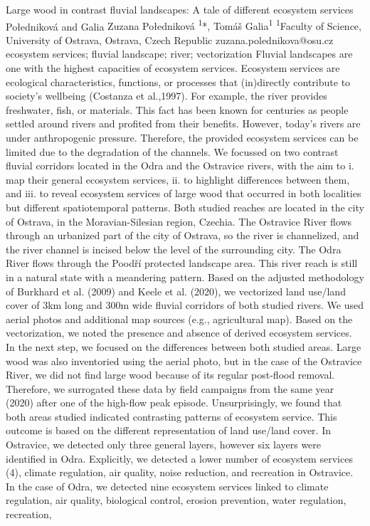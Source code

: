 \abstract
{Large wood in contrast fluvial landscapes: A tale of different ecosystem services} 
{Połedniková and Galia} 
{Zuzana Połedniková \textsuperscript{1}*, Tomáš Galia\textsuperscript{1}} 
{\TLtag} 
{
\textsuperscript{1}Faculty of Science, University of Ostrava, Ostrava, Czech Republic
}
{zuzana.polednikova@osu.cz}  %
{ecosystem services; fluvial landscape; river; vectorization}
{
Fluvial landscapes are one with the highest capacities of ecosystem services. Ecosystem services are ecological characteristics, functions, or processes that (in)directly contribute to society's wellbeing (Costanza et al.,1997). For example, the river provides freshwater, fish, or materials. This fact has been known for centuries as people settled around rivers and profited from their benefits. However, today’s rivers are under anthropogenic pressure. Therefore, the provided ecosystem services can be limited due to the degradation of the channels. We focussed on two contrast fluvial corridors located in the Odra and the Ostravice rivers, with the aim to i. map their general ecosystem services, ii. to highlight differences between them, and iii. to reveal ecosystem services of large wood that occurred in both localities but different spatiotemporal patterns. Both studied reaches are located in the city of Ostrava, in the Moravian-Silesian region, Czechia. The Ostravice River flows through an urbanized part of the city of Ostrava, so the river is channelized, and the river channel is incised below the level of the surrounding city. The Odra River flows through the Poodří protected landscape area. This river reach is still in a natural state with a meandering pattern. Based on the adjusted methodology of Burkhard et al. (2009) and Keele et al. (2020), we vectorized land use/land cover of 3km long and 300m wide fluvial corridors of both studied rivers.  We used aerial photos and additional map sources (e.g., agricultural map). Based on the vectorization, we noted the presence and absence of derived ecosystem services. In the next step, we focused on the differences between both studied areas. Large wood was also inventoried using the aerial photo, but in the case of the Ostravice River, we did not find large wood because of its regular post-flood removal. Therefore, we surrogated these data by field campaigns from the same year (2020) after one of the high-flow peak episode. Unsurprisingly, we found that both areas studied indicated contrasting patterns of ecosystem service. This outcome is based on the different representation of land use/land cover. In Ostravice, we detected only three general layers, however six layers were identified in Odra. Explicitly, we detected a lower number of ecosystem services (4), climate regulation, air quality, noise reduction, and recreation in Ostravice. In the case of Odra, we detected nine ecosystem services linked to climate regulation, air quality, biological control, erosion prevention, water regulation, recreation, }
